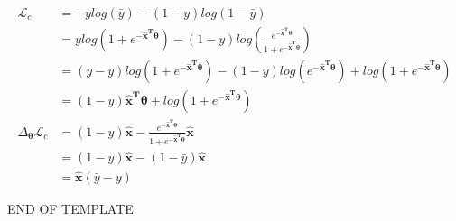 \begin{align*}
    \mathcal{L}_c &= -ylog(\bar{y}) - (1-y)log(1-\bar{y})\\
    &= ylog(1+e^{-\bm{\hat{x}^T\theta}})-(1-y)log(\frac{e^{-\bm{\hat{x}^T\theta}}}{1+e^{-\bm{\hat{x}^T\theta}}})\\
    &=(y-y)log(1+e^{-\bm{\hat{x}^T\theta}})-(1-y)log(e^{-\bm{\hat{x}^T\theta}})+log(1+e^{-\bm{\hat{x}^T\theta}})\\
    &=(1-y)\bm{\hat{x}^T\theta}+log(1+e^{-\bm{\hat{x}^T\theta}})\\
    \Delta_{\bm{\theta}}\mathcal{L}_c &=(1-y)\bm{\hat{x}}-\frac{e^{-\bm{\hat{x}^T\theta}}}{1+e^{-\bm{\hat{x}^T\theta}}}\bm{\hat{x}}\\
    &=(1-y)\bm{\hat{x}}-(1-\bar{y})\bm{\hat{x}}\\
    &=\bm{\hat{x}}(\bar{y}-y)
\end{align*}

END OF TEMPLATE